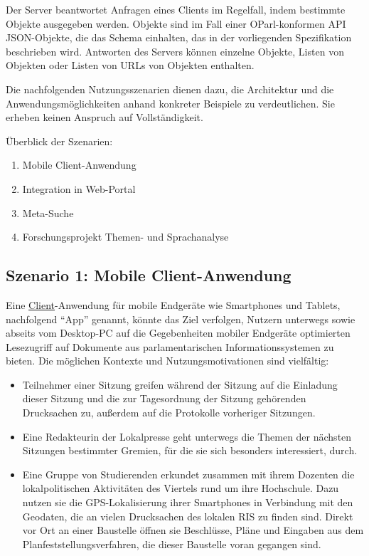\documentclass[,a4paper]{article}
\begin{document}
Der Server beantwortet Anfragen eines Clients im Regelfall, indem
bestimmte Objekte ausgegeben werden. Objekte sind im Fall einer
OParl-konformen API JSON-Objekte, die das Schema einhalten, das in der
vorliegenden Spezifikation beschrieben wird. Antworten des Servers
können einzelne Objekte, Listen von Objekten oder Listen von URLs von
Objekten enthalten.


Die nachfolgenden Nutzungsszenarien dienen dazu, die Architektur und die
Anwendungsmöglichkeiten anhand konkreter Beispiele zu verdeutlichen. Sie
erheben keinen Anspruch auf Vollständigkeit.

Überblick der Szenarien:

\begin{enumerate}
\def\labelenumi{\arabic{enumi}.}
\itemsep1pt\parskip0pt
\item
  Mobile Client-Anwendung
\item
  Integration in Web-Portal
\item
  Meta-Suche
\item
  Forschungsprojekt Themen- und Sprachanalyse
\end{enumerate}

\subsection{Szenario 1: Mobile
Client-Anwendung}\label{szenarioux5fmobileux5fclient}

Eine \hyperref[client]{Client}-Anwendung für mobile Endgeräte wie
Smartphones und Tablets, nachfolgend ``App'' genannt, könnte das Ziel
verfolgen, Nutzern unterwegs sowie abseits vom Desktop-PC auf die
Gegebenheiten mobiler Endgeräte optimierten Lesezugriff auf Dokumente
aus parlamentarischen Informationssystemen zu bieten. Die möglichen
Kontexte und Nutzungsmotivationen sind vielfältig:

\begin{itemize}
\item
  Teilnehmer einer Sitzung greifen während der Sitzung auf die Einladung
  dieser Sitzung und die zur Tagesordnung der Sitzung gehörenden
  Drucksachen zu, außerdem auf die Protokolle vorheriger Sitzungen.
\item
  Eine Redakteurin der Lokalpresse geht unterwegs die Themen der
  nächsten Sitzungen bestimmter Gremien, für die sie sich besonders
  interessiert, durch.
\item
  Eine Gruppe von Studierenden erkundet zusammen mit ihrem Dozenten die
  lokalpolitischen Aktivitäten des Viertels rund um ihre Hochschule.
  Dazu nutzen sie die GPS-Lokalisierung ihrer Smartphones in Verbindung
  mit den Geodaten, die an vielen Drucksachen des lokalen RIS zu finden
  sind. Direkt vor Ort an einer Baustelle öffnen sie Beschlüsse, Pläne
  und Eingaben aus dem Planfeststellungsverfahren, die dieser Baustelle
  voran gegangen sind.
\end{itemize}
\end{document}
